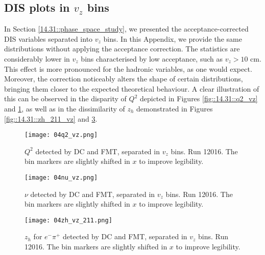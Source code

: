 \subsection{DIS plots in $v_z$ bins}
\label{20.04::dis_vz_plots}
    In Section \ref{14.31::phase_space_study}, we presented the acceptance-corrected DIS variables separated into $v_z$ bins.
    In this Appendix, we provide the same distributions without applying the acceptance correction.
    The statistics are considerably lower in $v_z$ bins characterised by low acceptance, such as $v_z > 10$ cm.
    This effect is more pronounced for the hadronic variables, as one would expect.
    Moreover, the correction noticeably alters the shape of certain distributions, bringing them closer to the expected theoretical behaviour.
    A clear illustration of this can be observed in the disparity of $Q^2$ depicted in Figures \ref{fig::14.31::q2_vz} and \ref{fig::20.04::q2_vz}, as well as in the dissimilarity of $z_h$ demonstrated in Figures \ref{fig::14.31::zh_211_vz} and \ref{fig::20.04::zh_211_vz}.

    \begin{figure}
        \centering
        \texttt{[image: 04q2\_vz.png]}
        \caption[$Q^2$ separated in $v_z$ bins]
        {$Q^2$ detected by DC and FMT, separated in $v_z$ bins.
        Run 12016.
        The bin markers are slightly shifted in $x$ to improve legibility.}
        \label{fig::20.04::q2_vz}
    \end{figure}

    \begin{figure}
        \centering
        \texttt{[image: 04nu\_vz.png]}
        \caption[$\nu$ separated in $v_z$ bins]
        {$\nu$ detected by DC and FMT, separated in $v_z$ bins.
        Run 12016.
        The bin markers are slightly shifted in $x$ to improve legibility.}
        \label{fig::20.04::nu_vz}
    \end{figure}

    \begin{figure}
        \centering
        \texttt{[image: 04zh\_vz\_211.png]}
        \caption[$z_h$ for $e^-\pi^+$ separated in $v_z$ bins]
        {$z_h$ for $e^-\pi^+$ detected by DC and FMT, separated in $v_z$ bins.
        Run 12016.
        The bin markers are slightly shifted in $x$ to improve legibility.}
        \label{fig::20.04::zh_211_vz}
    \end{figure}

